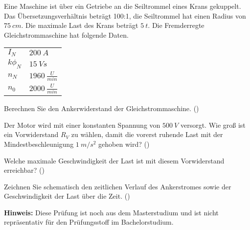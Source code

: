\begin{question}[section=2,name={9.5.2011},mode=exm,type=bsp,tags={20110509}]
Eine Maschine ist über ein Getriebe an die Seiltrommel eines Krans gekuppelt. Das Übersetzungsverhältnis beträgt 100:1, die Seiltrommel hat einen Radius von $75~cm$. Die maximale Last des Krans beträgt $5~t$. Die Fremderregte Gleichstrommaschine hat folgende Daten.\\
\begin{tabular}{L{2cm}l}
$I_{N}$ \dotfill &$200~A$\\
$k \phi_N$ \dotfill & $15~Vs$ \\
$n_N$ \dotfill & $1960~\frac{U}{min}$\\
$n_0$ \dotfill & $2000~\frac{U}{min}$
\end{tabular}
\begin{compactenum}
\item Berechnen Sie den Ankerwiderstand der Gleichstrommaschine. ()
\item Der Motor wird mit einer konstanten Spannung von $500~V$ versorgt. Wie groß ist ein Vorwiderstand $R_V$ zu wählen, damit die vorerst ruhende Last mit der Mindestbeschleunigung $1~ m/s^2$ gehoben wird? ()
\item Welche maximale Geschwindigkeit der Last ist mit diesem Vorwiderstand erreichbar? ()
\item Zeichnen Sie schematisch den zeitlichen Verlauf des Ankerstromes sowie der Geschwindigkeit der Last über die Zeit. ()
\end{compactenum}
\end{question}
\begin{solution}
\textbf{Hinweis:} Diese Prüfung ist noch aus dem Masterstudium und ist nicht repräsentativ für den Prüfungsstoff im Bachelorstudium.
\end{solution}